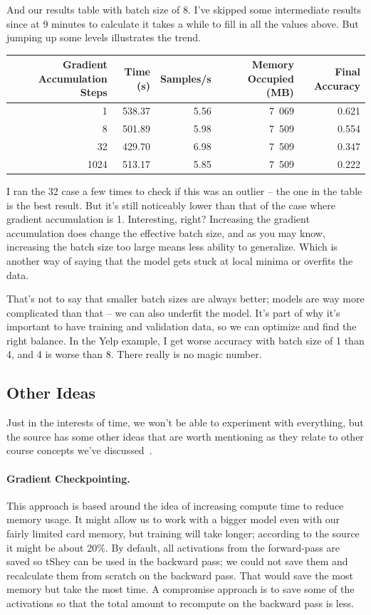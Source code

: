 \documentclass[a4paper]{report}
\begin{document}
And our results table with batch size of 8. I've skipped some intermediate results since at 9 minutes to calculate it takes a while to fill in all the values above. But jumping up some levels illustrates the trend.

\begin{center}
\begin{tabular}{r|r|r|r|r}
\textbf{Gradient Accumulation Steps} & \textbf{Time (s)} & \textbf{Samples/s} & \textbf{Memory Occupied (MB)} & \textbf{Final Accuracy}\\ \hline
1 & 538.37 & 5.56 & 7~069 & 0.621 \\
8 & 501.89 & 5.98 & 7~509 & 0.554 \\
32 & 429.70 & 6.98 & 7~509 & 0.347 \\
1024 & 513.17 & 5.85 & 7~509 & 0.222 \\
\end{tabular}
\end{center}

I ran the 32 case a few times to check if this was an outlier -- the one in the table is the best result. But it's still noticeably lower than that of the case where gradient accumulation is 1. Interesting, right? Increasing the gradient accumulation does change the effective batch size, and as you may know, increasing the batch size too large means less ability to generalize. Which is another way of saying that the model gets stuck at local minima or overfits the data.

That's not to say that smaller batch sizes are always better; models are way more complicated than that -- we can also underfit the model. It's part of why it's important to have training and validation data, so we can optimize and find the right balance. In the Yelp example, I get worse accuracy with batch size of 1 than 4, and 4 is worse than 8. There really is no magic number.

\subsection*{Other Ideas}
Just in the interests of time, we won't be able to experiment with everything, but the source has some other ideas that are worth mentioning as they relate to other course concepts we've discussed~\cite{hf}.

\paragraph{Gradient Checkpointing.} This approach is based around the idea of increasing compute time to reduce memory usage. It might allow us to work with a bigger model even with our fairly limited card memory, but training will take longer; according to the source it might be about 20\%. By default, all activations from the forward-pass are saved so tShey can be used in the backward pass; we could not save them and recalculate them from scratch on the backward pass. That would save the most memory but take the most time. A compromise approach is to save some of the activations so that the total amount to recompute on the backward pass is less. 
\end{document}

